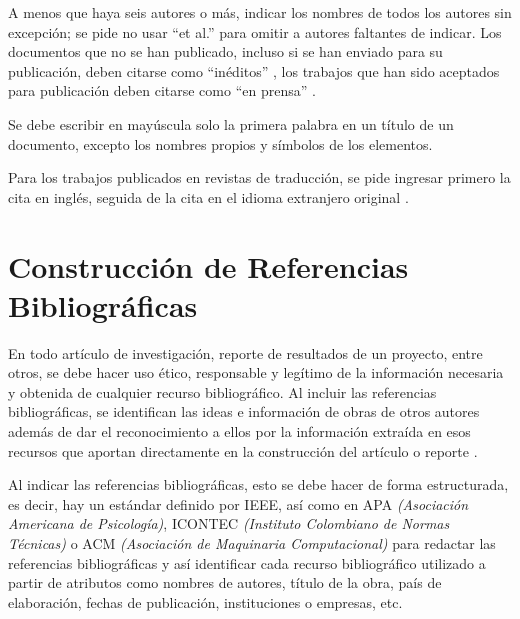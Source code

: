 \documentclass[letterpaper, 10pt, conference]{IEEEtran} %
\begin{document}
	A menos que haya seis autores o más, indicar los nombres de todos los autores sin excepción; se pide no usar ``et al.'' para omitir a autores faltantes de indicar. Los documentos que no se han publicado, incluso si se han enviado para su publicación, deben citarse como ``inéditos'' \cite{referenciaBibliografica7}, los trabajos que han sido aceptados para publicación deben citarse como ``en prensa'' \cite{referenciaBibliografica8}.
	
	Se debe escribir en mayúscula solo la primera palabra en un título de un documento, excepto los nombres propios y símbolos de los elementos.
	
	Para los trabajos publicados en revistas de traducción, se pide ingresar primero la cita en inglés, seguida de la cita en el idioma extranjero original \cite{referenciaBibliografica9}.
	
	\section*{Construcción de Referencias Bibliográficas} \label{seccionConstruccionDeReferenciasBibliograficas}
	En todo artículo de investigación, reporte de resultados de un proyecto, entre otros, se debe hacer uso ético, responsable y legítimo de la información necesaria y obtenida de cualquier recurso bibliográfico. Al incluir las referencias bibliográficas, se identifican las ideas e información de obras de otros autores además de dar el reconocimiento a ellos por la información extraída en esos recursos que aportan directamente en la construcción del artículo o reporte \cite{referenciaBibliografica10}.
	
	Al indicar las referencias bibliográficas, esto se debe hacer de forma estructurada, es decir, hay un estándar definido por IEEE, así como en APA \emph{(Asociación Americana de Psicología)}, ICONTEC \emph{(Instituto Colombiano de Normas Técnicas)} o ACM \emph{(Asociación de Maquinaria Computacional)} para redactar las referencias bibliográficas y así identificar cada recurso bibliográfico utilizado a partir de atributos como nombres de autores, título de la obra, país de elaboración, fechas de publicación, instituciones o empresas, etc.
	
\end{document}
